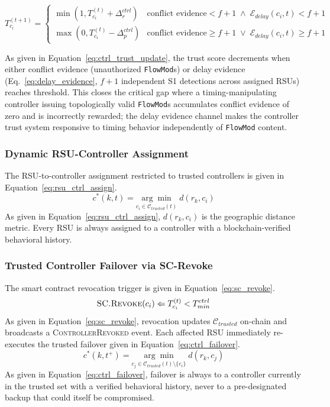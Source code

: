 \documentclass[12pt, a4paper]{report}
\begin{document}
{{\begin{equation}
T_{c_i}^{(t+1)}{=}
\begin{cases}
\min(1,T_{c_i}^{(t)}{+}\Delta_r^{ctrl}) &
\text{conflict evidence}{<}f{+}1
\;\land\;
\mathcal{E}_{delay}(c_i,t){<}f{+}1
\\
\max(0,T_{c_i}^{(t)}{-}\Delta_p^{ctrl}) &
\text{conflict evidence}{\geq}f{+}1
\;\lor\;
\mathcal{E}_{delay}(c_i,t){\geq}f{+}1
\end{cases}
\label{eq:ctrl_trust_update}
\end{equation}

As given in Equation~\eqref{eq:ctrl_trust_update},
the trust score decrements when either conflict
evidence (unauthorized \texttt{FlowMod}s) or delay
evidence (Eq.~\ref{eq:delay_evidence}, $f{+}1$
independent S1 detections across assigned \ac{RSU}s)
reaches threshold. This closes the critical gap
where a timing-manipulating controller issuing
topologically valid \texttt{FlowMod}s accumulates
conflict evidence of zero and is incorrectly rewarded;
the delay evidence channel makes the controller trust
system responsive to timing behavior independently
of \texttt{FlowMod} content.




\subsubsection{Dynamic RSU-Controller Assignment}
The \ac{RSU}-to-controller assignment restricted to
trusted controllers is given in
Equation~\eqref{eq:rsu_ctrl_assign}.
\begin{equation}
c^*(k,t){=}
\underset{c_i\in\mathcal{C}_{trusted}(t)}
{\arg\min}\;d(r_k,c_i)
\label{eq:rsu_ctrl_assign}
\end{equation}
As given in Equation~\eqref{eq:rsu_ctrl_assign},
$d(r_k,c_i)$ is the geographic distance metric. Every
\ac{RSU} is always assigned to a controller with a
blockchain-verified behavioral history.



\subsubsection{Trusted Controller Failover via SC-Revoke}
The smart contract revocation trigger is given in
Equation~\eqref{eq:sc_revoke}.
\begin{equation}
\textsc{SC.Revoke}(c_i)\Leftarrow
T_{c_i}^{(t)}<T_{min}^{ctrl}
\label{eq:sc_revoke}
\end{equation}
As given in Equation~\eqref{eq:sc_revoke}, revocation
updates $\mathcal{C}_{trusted}$ on-chain and broadcasts
a \textsc{ControllerRevoked} event. Each affected \ac{RSU}
immediately re-executes the trusted failover given in
Equation~\eqref{eq:ctrl_failover}.
\begin{equation}
c^*(k,t^+){=}
\underset{c_j\in
\mathcal{C}_{trusted}(t)\setminus\{c_i\}}
{\arg\min}\;d(r_k,c_j)
\label{eq:ctrl_failover}
\end{equation}
As given in Equation~\eqref{eq:ctrl_failover}, failover
is always to a controller currently in the trusted set
with a verified behavioral history, never to a
pre-designated backup that could itself be compromised.



}}
\end{document}
